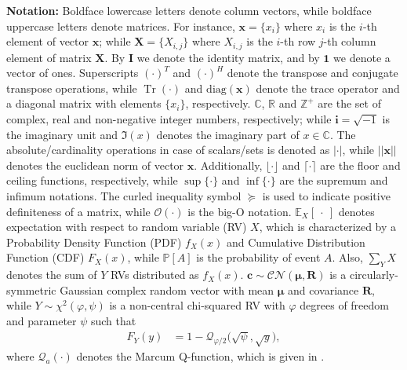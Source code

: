 \documentclass[10pt,journal,a4paper]{IEEEtran}
\DeclareMathOperator{\Tr}{Tr}
\begin{document}
	\textbf{Notation:} Boldface lowercase letters denote column vectors, while boldface uppercase letters denote matrices. For instance, $\mathbf{x}=\{x_i\}$ where $x_i$ is the $i$-th element of vector $\mathbf{x}$; while $\mathbf{X}=\{X_{i,j}\}$ where $X_{i,j}$ is the $i$-th row $j$-th column element of matrix $\mathbf{X}$. By $\mathbf{I}$ we denote the identity matrix, and by $\mathbf{1}$ we denote a vector of ones. Superscripts $(\cdot)^T$ and $(\cdot)^H$ denote the transpose and conjugate transpose operations, while $\Tr(\cdot)$ and $\mathrm{diag}(\mathbf{x})$ denote the trace operator and a diagonal matrix with elements $\{x_i\}$, respectively. $\mathbb{C}$, $\mathbb{R}$ and $\mathbb{Z}^+$ are the set of complex, real and non-negative integer numbers, respectively; while $\bm{i}=\sqrt{-1}$ is the imaginary unit and $\Im(x)$ denotes the imaginary part of $x\in\mathbb{C}$. The absolute/cardinality operations in case of scalars/sets is denoted as $|\cdot|$, while $||\mathbf{x}||$ denotes the euclidean norm of vector $\mathbf{x}$.
	Additionally, $\lfloor\cdot\rfloor$ and	$\lceil\cdot\rceil$ are the floor and ceiling functions, respectively, while $\sup\{\cdot\}$ and $\inf\{\cdot\}$ are the supremum and infimum notations.
	The curled inequality symbol $\succeq$ is used  to indicate positive definiteness of a matrix, while $\mathcal{O}(\cdot)$ is the big-O notation.
	$\mathbb{E}_X[\!\ \cdot\ \!]$ denotes expectation with respect to random variable (RV) $X$, which is characterized by a Probability Density Function (PDF) $f_X(x)$ and Cumulative Distribution Function (CDF) $F_X(x)$, while $\mathbb{P}[A]$ is the probability of event $A$.
	Also, $\sum_Y X$ denotes the sum of $Y$ RVs distributed as $f_X(x)$.
	$\mathbf{c}\sim\mathcal{CN}(\bm{\mu},\mathbf{R})$ is a circularly-symmetric Gaussian complex random vector with mean $\bm{\mu}$ and covariance $\mathbf{R}$, while $Y\sim\chi^2(\varphi,\psi)$ is a non-central chi-squared RV with $\varphi$ degrees of freedom and parameter $\psi$ such that \cite{Kobayashi.2011}
	\begin{align}
	F_Y(y)&=1-\mathcal{Q}_{\varphi/2}\big(\sqrt{\psi},\sqrt{y}\big),\label{cdf}
	\end{align}
	where $\mathcal{Q}_a(\cdot)$ denotes the Marcum Q-function, which is given in \cite[Eq. (1)]{Nuttall.1975}.
\end{document}
